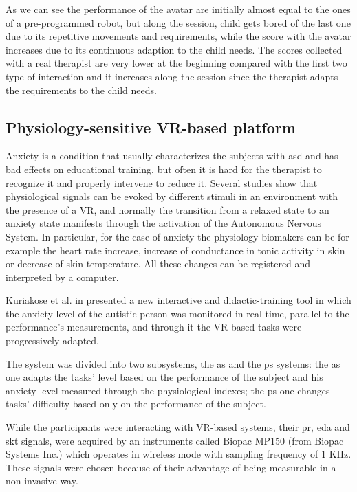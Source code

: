 \documentclass[12pt,journal,draftclsnofoot,onecolumn]{IEEEtran}
\makeatletter
\let\origsubsubsection\subsubsection
\renewcommand\subsubsection{\@ifstar{\starsubsubsection}{\nostarsubsubsection}}
\newcommand\nostarsubsubsection[1]
{\subsubsectionprelude\origsubsubsection{#1}}
\newcommand\subsubsectionprelude{%
  \vspace{6pt}
}
\makeatother
\begin{document}
As we can see the performance of the avatar are initially almost equal to the ones of a pre-programmed robot, but along the session, child gets bored of the last one due to its repetitive movements and requirements, while the score with the avatar increases due to its continuous adaption to the child needs.
The scores collected with a real therapist are very lower at the beginning compared with the first two type of interaction and it increases along the session since the therapist adapts the requirements to the child needs.

\subsection{Physiology-sensitive VR-based platform}
\label{sec:anxiety}

Anxiety is a condition that usually characterizes the subjects with \gls{asd} and has bad effects on educational training, but often it is hard for the therapist to recognize it and properly intervene to reduce it. Several studies show that physiological signals can be evoked by different stimuli in an environment with the presence of a VR, and normally the transition from a relaxed state to an anxiety state manifests through the activation of the Autonomous Nervous System. In particular, for the case of anxiety the physiology biomakers can be for example the heart rate increase, increase of conductance in tonic activity in skin or decrease of skin temperature. All these changes can be registered and interpreted by a computer.

Kuriakose et al. in \cite{Kuriakose2017} presented a new interactive and didactic-training tool in which the anxiety level of the autistic person was monitored in real-time, parallel to the performance's measurements, and through it the VR-based tasks were progressively adapted.

\subsubsection{Structure of the trial}
The system was divided into two subsystems, the \gls{as} and the \gls{ps} systems: the \gls{as} one adapts the tasks' level based on the performance of the subject and his anxiety level measured through the physiological indexes; the \gls{ps} one changes tasks' difficulty based only on the performance of the subject.

While the participants were interacting with VR-based systems, their \gls{pr}, \gls{eda} and \gls{skt} signals, were acquired by an instruments called Biopac MP150 (from Biopac Systems Inc.) which operates in wireless mode with sampling frequency of 1 KHz. These signals were chosen because of their advantage of being measurable in a non-invasive way. 
\end{document}
